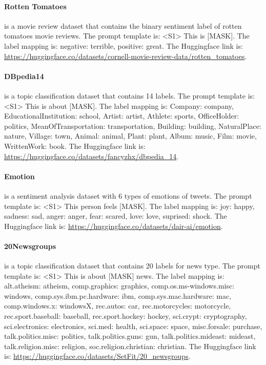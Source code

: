\paragraph{Rotten Tomatoes} \citep{pang2005seeing} is a movie review dataset that contains the binary sentiment label of rotten tomatoes movie reviews. The prompt template is: \textless{}S1\textgreater{} This is {[}MASK{]}. The label mapping is: negative: terrible, positive: great. The Huggingface link is: \url{https://huggingface.co/datasets/cornell-movie-review-data/rotten_tomatoes}.

\paragraph{DBpedia14} \citep{zhang2015character} is a topic classification dataset that contains 14 labels. The prompt template is: \textless{}S1\textgreater{} This is about {[}MASK{]}. The label mapping is: Company: company, EducationalInstitution: school, Artist: artist, Athlete: sports, OfficeHolder: politics, MeanOfTransportation: transportation, Building: building, NaturalPlace: nature, Village: town, Animal: animal, Plant: plant, Album: music, Film: movie, WrittenWork: book. The Huggingface link is: \url{https://huggingface.co/datasets/fancyzhx/dbpedia_14}. 

\paragraph{Emotion} \citep{saravia-etal-2018-carer} is a sentiment analysis dataset with 6 types of emotions of tweets. The prompt template is: \textless{}S1\textgreater{} This person feels {[}MASK{]}. The label mapping is: joy: happy, sadness: sad, anger: anger, fear: scared, love: love, suprised: shock. The Huggingface link is: \url{https://huggingface.co/datasets/dair-ai/emotion}.

\paragraph{20Newsgroups} \citep{LANG1995331} is a topic classification dataset that contains 20 labels for news type. The prompt template is: \textless{}S1\textgreater{} This is about {[}MASK{]} news. The label mapping is: alt.atheism: atheism, comp.graphics: graphics, comp.os.ms-windows.misc: windows, comp.sys.ibm.pc.hardware: ibm, comp.sys.mac.hardware: mac, comp.windows.x: windowsX, rec.autos: car, rec.motorcycles: motorcycle, rec.sport.baseball: baseball, rec.sport.hockey: hockey, sci.crypt: cryptography, sci.electronics: electronics, sci.med: health, sci.space: space, misc.forsale: purchase, talk.politics.misc: politics, talk.politics.guns: gun, talk.politics.mideast: mideast, talk.religion.misc: religion, soc.religion.christian: christian. The Huggingface link is: \url{https://huggingface.co/datasets/SetFit/20_newsgroups}.

